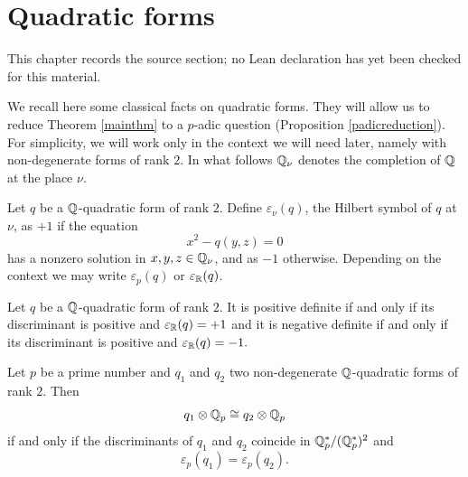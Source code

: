 \chapter{Quadratic forms}
\label{standard-conjectures-abelian-fourfolds-chapter-09}

\begin{remark}
\label{standard-conjectures-abelian-fourfolds-chapter-09-source}
This chapter records the source section; no Lean declaration has yet been checked for this material.
\notready
\end{remark}

We recall here some classical facts on quadratic forms. They will allow us to reduce Theorem \ref{mainthm} to a $p$-adic question (Proposition \ref{padicreduction}). For simplicity, we will  work only in the context we will need later, namely with non-degenerate  forms of rank $2$.
In what follows $\mathbb{Q}_\nu$ denotes the completion of $\mathbb{Q}$ at the place $\nu$.
\begin{definition}
\notready\label{Hilbert}
Let $q$ be a $\mathbb{Q}$-quadratic form of rank $2$. Define $\varepsilon_\nu(q)$, the Hilbert symbol of $q$ at $\nu$, as  $+1$ if the equation
\[x^2-q(y,z)=0\]
has a nonzero solution in $x,y,z\in \mathbb{Q}_\nu$, and as $-1$ otherwise. Depending on the context we may write $\varepsilon_p(q)$ or $\varepsilon_{\mathbb{R}}(q)$.
\end{definition}

\begin{remark}
\notready\label{remarksignature}
Let $q$ be a $\mathbb{Q}$-quadratic form of rank $2$. It is positive definite if and only if its discriminant is positive and $\varepsilon_{\mathbb{R}}(q)=+1$
and it is negative definite if and only if its discriminant is positive and $\varepsilon_{\mathbb{R}}(q)=-1.$
\end{remark}

\begin{prop}
\notready\label{localinvariant}
Let $p$ be a prime number and $q_1$ and $q_2$   two non-degenerate $\mathbb{Q}$-quadratic forms of rank $2$. Then
\[q_1 \otimes \mathbb{Q}_p \cong q_2 \otimes \mathbb{Q}_p\]
if and only if the discriminants of $q_1$ and $q_2$ coincide in $\mathbb{Q}_p^*/(\mathbb{Q}_p^*)^2$ and
\[\varepsilon_p(q_1)=\varepsilon_p(q_2).\]
\end{prop}

